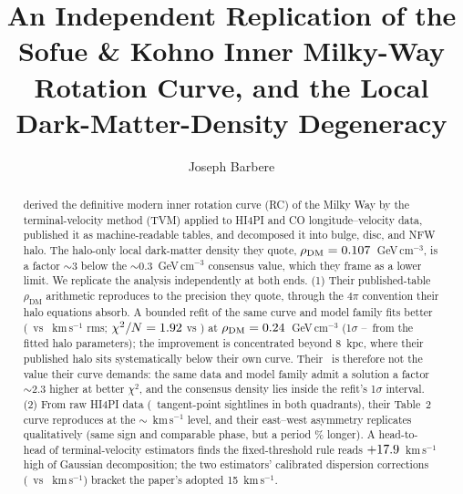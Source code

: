 \documentclass[twocolumn]{aastex631}
\begin{document}
\title{An Independent Replication of the Sofue \& Kohno Inner Milky-Way Rotation Curve,
and the Local Dark-Matter-Density Degeneracy}
\author[0009-0008-3289-4447]{Joseph Barbere}

\begin{abstract}
\citet{sofue2025} derived the definitive modern inner rotation curve (RC) of the Milky Way
by the terminal-velocity method (TVM) applied to HI4PI and CO longitude--velocity data,
published it as machine-readable tables, and decomposed it into bulge, disc, and NFW halo.
The halo-only local dark-matter density they quote, $\rho_\mathrm{DM} = 0.107$~GeV\,cm$^{-3}$,
is a factor $\sim$3 below the $\sim$0.3~GeV\,cm$^{-3}$ consensus value, which they frame as a
lower limit. We replicate the analysis independently at both ends. (1) Their published-table
$\rho_\mathrm{DM}$ arithmetic reproduces to the precision they quote, through the $4\pi$
convention their halo equations absorb. A bounded refit of the same curve and model family
fits better (\irRmsOurs\ vs \irRmsTheirs~km\,s$^{-1}$ rms; $\chi^2/N = 1.92$ vs
\irChiTheirs) at $\rho_\mathrm{DM} = 0.24$~GeV\,cm$^{-3}$ (1$\sigma$
\irRhoLo--\irRhoHi\ from the fitted halo parameters); the improvement is concentrated beyond
8~kpc, where their published halo sits systematically below their own curve. Their
\irRhoTheirs\ is therefore not the value their curve demands: the same data and model family
admit a solution a factor $\sim$2.3 higher at better $\chi^2$, and the consensus density lies
inside the refit's 1$\sigma$ interval. (2) From raw HI4PI data (\irNsight\ tangent-point
sightlines in both quadrants), their Table~2 curve reproduces at the
$\sim$\irTabTwoAbs~km\,s$^{-1}$ level, and their east--west asymmetry replicates
qualitatively (same sign and comparable phase, but a period \irEwPeriodOffPct\% longer). A
head-to-head of terminal-velocity estimators finds the fixed-threshold rule reads
$+17.9$~km\,s$^{-1}$ high of Gaussian decomposition; the two estimators' calibrated
dispersion corrections (\irSigGauss\ vs \irSigThresh~km\,s$^{-1}$) bracket the paper's
adopted 15~km\,s$^{-1}$.
\end{abstract}

\end{document}
